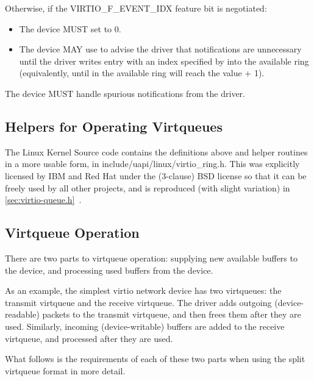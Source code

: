 Otherwise, if the VIRTIO_F_EVENT_IDX feature bit is negotiated:
\begin{itemize}
\item The device MUST set  to 0.
\item The device MAY use  to advise the driver that notifications are unnecessary until the driver writes entry with an index specified by  into the available ring (equivalently, until  in the
available ring will reach the value  + 1).
\end{itemize}

The device MUST handle spurious notifications from the driver.

\subsection{Helpers for Operating Virtqueues}\label{sec:Basic Facilities of a Virtio Device / Virtqueues / Helpers for Operating Virtqueues}

The Linux Kernel Source code contains the definitions above and
helper routines in a more usable form, in
include/uapi/linux/virtio_ring.h. This was explicitly licensed by IBM
and Red Hat under the (3-clause) BSD license so that it can be
freely used by all other projects, and is reproduced (with slight
variation) in \ref{sec:virtio-queue.h}~.

\subsection{Virtqueue Operation}\label{sec:Basic Facilities of a Virtio Device / Virtqueues / Virtqueue Operation}

There are two parts to virtqueue operation: supplying new
available buffers to the device, and processing used buffers from
the device.

\begin{note} As an
example, the simplest virtio network device has two virtqueues: the
transmit virtqueue and the receive virtqueue. The driver adds
outgoing (device-readable) packets to the transmit virtqueue, and then
frees them after they are used. Similarly, incoming (device-writable)
buffers are added to the receive virtqueue, and processed after
they are used.
\end{note}

What follows is the requirements of each of these two parts
when using the split virtqueue format in more detail.

